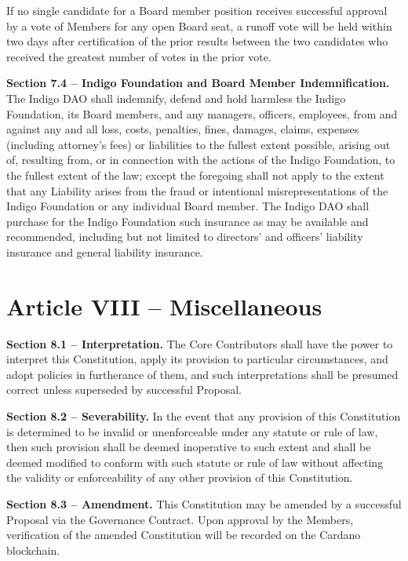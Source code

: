 If no single candidate for a Board member position receives successful
approval by a vote of Members for any open Board seat, a runoff vote
will be held within two days after certification of the prior results
between the two candidates who received the greatest number of votes in
the prior vote.

\textbf{Section 7.4 -- Indigo Foundation and Board Member
Indemnification.} The Indigo DAO shall indemnify, defend and hold
harmless the Indigo Foundation, its Board members, and any managers,
officers, employees, from and against any and all loss, costs,
penalties, fines, damages, claims, expenses (including attorney's fees)
or liabilities to the fullest extent possible, arising out of, resulting
from, or in connection with the actions of the Indigo Foundation, to the
fullest extent of the law; except the foregoing shall not apply to the
extent that any Liability arises from the fraud or intentional
misrepresentations of the Indigo Foundation or any individual Board
member. The Indigo DAO shall purchase for the Indigo Foundation such
insurance as may be available and recommended, including but not limited
to directors' and officers' liability insurance and general liability
insurance.

\hypertarget{article-viii-miscellaneous}{%
\section{Article VIII --
Miscellaneous}\label{article-viii-miscellaneous}}

\textbf{Section 8.1 -- Interpretation.} The Core Contributors shall have
the power to interpret this Constitution, apply its provision to
particular circumstances, and adopt policies in furtherance of them, and
such interpretations shall be presumed correct unless superseded by
successful Proposal.

\textbf{Section 8.2 -- Severability.} In the event that any provision of
this Constitution is determined to be invalid or unenforceable under any
statute or rule of law, then such provision shall be deemed inoperative
to such extent and shall be deemed modified to conform with such statute
or rule of law without affecting the validity or enforceability of any
other provision of this Constitution.

\textbf{Section 8.3 -- Amendment.} This Constitution may be amended by a
successful Proposal via the Governance Contract. Upon approval by the
Members, verification of the amended Constitution will be recorded on
the Cardano blockchain.

